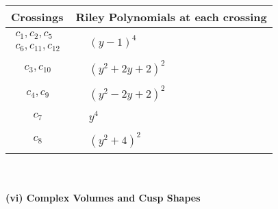 \documentclass[1p]{elsarticle_modified}
\theoremstyle{definition}
\begin{document}
\begin{tabular}{m{50pt}|m{274pt}}
Crossings & \hspace{64pt}Riley Polynomials at each crossing \\
\hline $$\begin{aligned}c_{1},c_{2},c_{5}\\c_{6},c_{11},c_{12}\end{aligned}$$&$\begin{aligned}
&(y-1)^4
\end{aligned}$\\
\hline $$\begin{aligned}c_{3},c_{10}\end{aligned}$$&$\begin{aligned}
&(y^2+2 y+2)^2
\end{aligned}$\\
\hline $$\begin{aligned}c_{4},c_{9}\end{aligned}$$&$\begin{aligned}
&(y^2-2 y+2)^2
\end{aligned}$\\
\hline $$\begin{aligned}c_{7}\end{aligned}$$&$\begin{aligned}
&y^4
\end{aligned}$\\
\hline $$\begin{aligned}c_{8}\end{aligned}$$&$\begin{aligned}
&(y^2+4)^2
\end{aligned}$\\
\hline
\end{tabular}\\~\\
\newpage\flushleft \textbf{(vi) Complex Volumes and Cusp Shapes}
\end{document}
